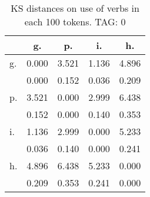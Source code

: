 \begin{table}[h!]
\begin{center}
\begin{tabular}{| l | c | c | c | c |}\hline
 & g. & p. & i. & h. \\\hline
g. & 0.000  & 3.521  & 1.136  & 4.896 \\\hline
 & 0.000  & 0.152  & 0.036  & 0.209 \\\hline
p. & 3.521  & 0.000  & 2.999  & 6.438 \\\hline
 & 0.152  & 0.000  & 0.140  & 0.353 \\\hline
i. & 1.136  & 2.999  & 0.000  & 5.233 \\\hline
 & 0.036  & 0.140  & 0.000  & 0.241 \\\hline
h. & 4.896  & 6.438  & 5.233  & 0.000 \\\hline
 & 0.209  & 0.353  & 0.241  & 0.000 \\\hline
\end{tabular}
\caption{KS distances on use of verbs in each 100 tokens. TAG: 0}
\end{center}
\end{table}